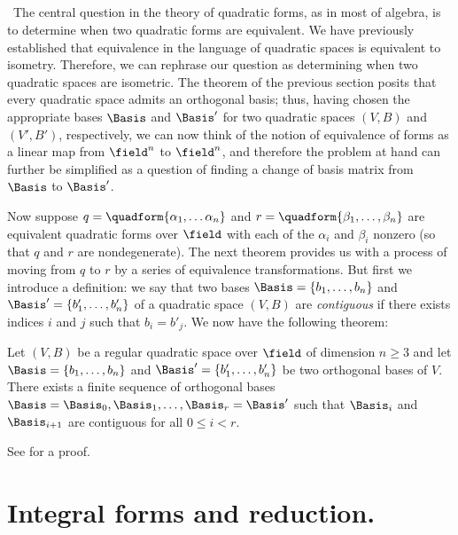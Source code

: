 \subsection{}~The central question in the theory of quadratic forms, as in most of algebra, is to determine when two quadratic forms are equivalent. We have previously established that equivalence in the language of quadratic spaces is equivalent to isometry. Therefore, we can rephrase our question as determining when two quadratic spaces are isometric. The theorem of the previous section posits that every quadratic space admits an orthogonal basis; thus, having chosen the appropriate bases \(\Basis\) and \(\Basis'\) for two quadratic spaces \((V, B)\) and \((V', B')\), respectively, we can now think of the notion of equivalence of forms as a linear map from \(\field^n\) to \(\field^n\), and therefore the problem at hand can further be simplified as a question of finding a change of basis matrix from \(\Basis\) to \(\Basis'\).\label{sec:contiguous-bases}

Now suppose \(q = \quadform{\alpha_1, \dots \alpha_n}\) and \(r = \quadform{\beta_1, \dots, \beta_n}\) are equivalent quadratic forms over \(\field\) with each of the \(\alpha_i\) and \(\beta_i\) nonzero (so that \(q\) and \(r\) are nondegenerate). The next theorem provides us with a process of moving from \(q\) to \(r\) by a series of equivalence transformations. But first we introduce a definition: we say that two bases \(\Basis = \{b_1, \dots, b_n\}\) and \(\Basis' = \{b_1', \dots, b_n'\}\) of a quadratic space \((V, B)\) are \emph{contiguous} if there exists indices \(i\) and \(j\) such that \(b_i = b'_j\). We now have the following theorem:

\begin{theorem}
  Let \((V, B)\) be a regular quadratic space over \(\field\) of dimension \(n \geq 3\) and let \(\Basis = \{b_1, \dots, b_n\}\) and \(\Basis' = \{b_1', \dots, b_n'\}\) be two orthogonal bases of \(V\). There exists a finite sequence of orthogonal bases \(\Basis = \Basis_0, \Basis_1, \dots, \Basis_r = \Basis'\) such that \(\Basis_i\) and \(\Basis_{i+1}\) are contiguous for all \(0 \leq i < r\).
\end{theorem}

See \cite[pp.~30--31]{serre2012course} for a proof.

\section{Integral forms and reduction.}


